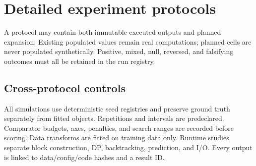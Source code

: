 
\chapter{Detailed experiment protocols}
\label{app:experiments}

\begin{statusbox}
A protocol may contain both immutable executed outputs and planned expansion. Existing populated
values remain real computations; planned cells are never populated synthetically. Positive,
mixed, null, reversed, and falsifying outcomes must all be retained in the run registry.
\end{statusbox}

\section{Cross-protocol controls}
All simulations use deterministic seed registries and preserve ground truth separately from fitted
objects. Repetitions and intervals are predeclared. Comparator budgets, axes, penalties, and search
ranges are recorded before scoring. Data transforms are fitted on training data only. Runtime
studies separate block construction, DP, backtracking, prediction, and I/O. Every output is linked
to data/config/code hashes and a result ID.
